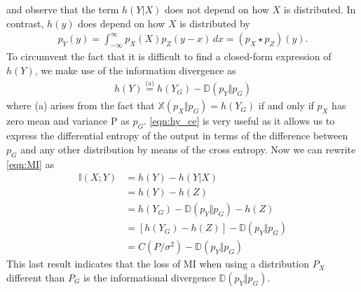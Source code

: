 and observe that the term $h(Y \vert X)$ does not depend on how $X$ is distributed. In contrast, $h(y)$ does depend on how $X$ is distributed by
\begin{align}
	p_Y(y) = \int_{-\infty}^{\infty} p_X(X)p_Z(y -x) \,dx = (p_X \star p_Z)(y).
\end{align}
To circumvent the fact that it is difficult to find a closed-form expression of $h(Y)$, we make use of the information divergence as
\begin{align}
\label{eqn:hy_ce}
	h(Y) \overset{\text{(a)}}{=}  h(Y_G) - \mathbb{D}(p_Y \Vert p_G)
\end{align}
where (a) arises from the fact that $\mathbb{X}(p_X \Vert p_G) = h(Y_G)$ if and only if $p_X$ has zero mean and variance P as $p_G$. \ref{eqn:hy_ce} is very useful as it allows us to express the differential entropy of the output in terms of the difference between $p_G$ and any other distribution by means of the cross entropy.
Now we can rewrite \ref{eqn:MI} as
\begin{align}
	\mathbb{I}(X;Y) &= h(Y) - h(Y \vert X)\\
	& = h(Y) - h(Z)\\
	& = h(Y_G) - \mathbb{D}(p_Y \Vert p_G) - h(Z)\\
	& = [h(Y_G) - h(Z)] - \mathbb{D}(p_Y \Vert p_G)\\
	& = C(P/\sigma^2) - \mathbb{D}(p_Y \Vert p_G)  \label{eq:C_minus_D}
\end{align}
This last result indicates that the loss of MI when using a distribution $P_X$ different than $P_G$ is the informational divergence $\mathbb{D}(p_Y \Vert p_G)$.\\

